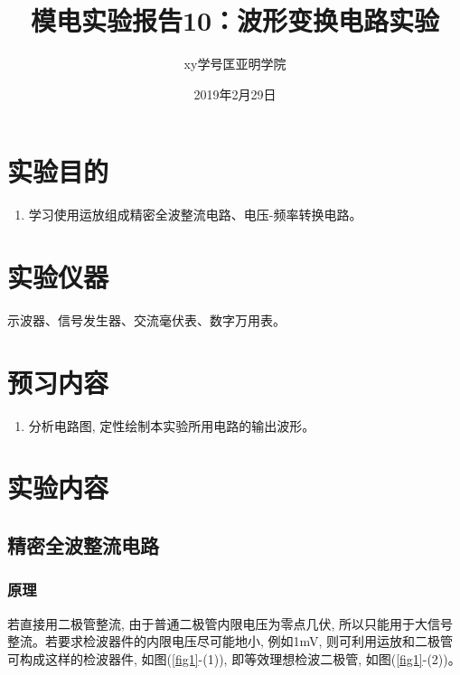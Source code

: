 \documentclass[a4paper]{article}
\title{模电实验报告10：波形变换电路实验}
\author{xy\quad 学号\quad 匡亚明学院}
\date{2019年2月29日}
\begin{document}
\maketitle


\section{实验目的}
\begin{enumerate}
\item 学习使用运放组成精密全波整流电路、电压-频率转换电路。
\end{enumerate}

\section{实验仪器}
示波器、信号发生器、交流毫伏表、数字万用表。

\section{预习内容}
\begin{enumerate}
\item 分析电路图, 定性绘制本实验所用电路的输出波形。
\end{enumerate}

\section{实验内容}
\subsection{精密全波整流电路}
\subsubsection{原理}
若直接用二极管整流, 由于普通二极管内限电压为零点几伏, 所以只能用于大信号整流。若要求检波器件的内限电压尽可能地小, 例如1mV, 则可利用运放和二极管可构成这样的检波器件, 如图(\ref{fig1}-(1)), 即等效理想检波二极管, 如图(\ref{fig1}-(2))。
\end{document}
